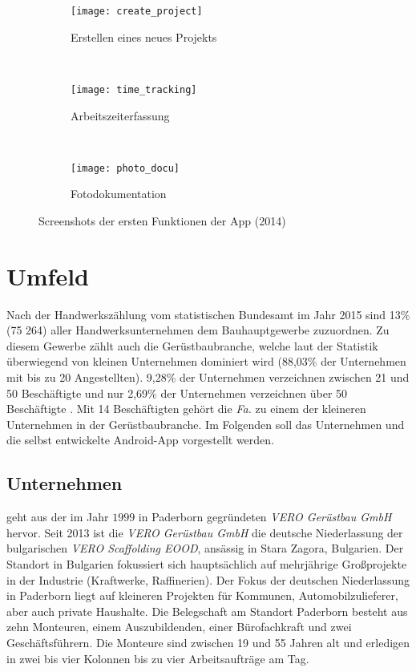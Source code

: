 \begin{figure}[h]
  \begin{subfigure}[t]{0.3\textwidth}
    \centering
    \texttt{[image: create\_project]}
    \caption{Erstellen eines neues Projekts}
  \end{subfigure}
  ~
  \begin{subfigure}[t]{0.3\textwidth}
    \centering
    \texttt{[image: time\_tracking]}
    \caption{Arbeitszeiterfassung}
  \end{subfigure}
  ~
  \begin{subfigure}[t]{0.3\textwidth}
    \centering
    \texttt{[image: photo\_docu]}
    \caption{Fotodokumentation}
  \end{subfigure}
  \centering
  \caption{Screenshots der ersten Funktionen der App (2014)}
  \label{fig:app14}
\end{figure}

\section{Umfeld}
Nach der Handwerkszählung vom statistischen Bundesamt im Jahr 2015 sind 13\% (75 264) aller Handwerksunternehmen dem Bauhauptgewerbe zuzuordnen.
Zu diesem Gewerbe zählt auch die Gerüstbaubranche, welche laut der Statistik überwiegend von kleinen Unternehmen dominiert wird (88,03\% der Unternehmen mit bis zu 20 Angestellten). 
9,28\% der Unternehmen verzeichnen zwischen 21 und 50 Beschäftigte und nur 2,69\% der Unternehmen verzeichnen über 50 Beschäftigte \citep{HZ17}.
Mit 14 Beschäftigten gehört die \emph{Fa.} \vr{} zu einem der kleineren Unternehmen in der Gerüstbaubranche.
Im Folgenden soll das Unternehmen und die selbst entwickelte Android-App vorgestellt werden.

\subsection{Unternehmen}
\vr{} geht aus der im Jahr $1999$ in Paderborn gegründeten \emph{VERO Gerüstbau GmbH} hervor. 
Seit 2013 ist die \emph{VERO Gerüstbau GmbH} die deutsche Niederlassung der bulgarischen \emph{VERO Scaffolding EOOD}, ansässig in Stara Zagora, Bulgarien.
Der Standort in Bulgarien fokussiert sich hauptsächlich auf mehrjährige Großprojekte in der Industrie (Kraftwerke, Raffinerien).
Der Fokus der deutschen Niederlassung in Paderborn liegt auf kleineren Projekten für Kommunen, Automobilzulieferer, aber auch private Haushalte.
Die Belegschaft am Standort Paderborn besteht aus zehn Monteuren, einem Auszubildenden, einer Bürofachkraft und zwei Geschäftsführern.
Die Monteure sind zwischen 19 und 55 Jahren alt und erledigen in zwei bis vier Kolonnen bis zu vier Arbeitsaufträge am Tag.

